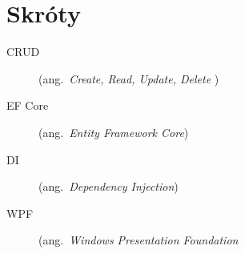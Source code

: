 \chapter*{Skróty}\mbox{}
\label{sec:skroty}
\noindent
\begin{description}
  \item [CRUD] (ang.\ \emph{Create, Read, Update, Delete })
  \item [EF Core] (ang.\ \emph{Entity Framework Core})
  \item [DI] (ang.\ \emph{Dependency Injection})
  \item [WPF] (ang.\ \emph{Windows Presentation Foundation}

\end{description}
